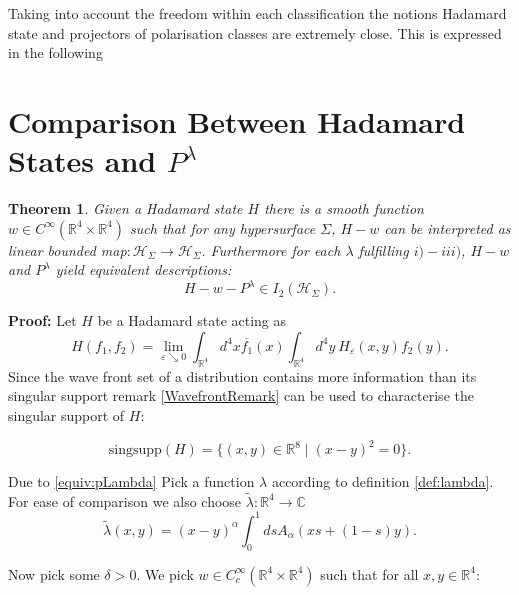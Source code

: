 \documentclass[a4paper,11pt]{article}
\newtheorem{thm}{Theorem}
\begin{document}
Taking into account the freedom within each classification the notions Hadamard state and  projectors of polarisation classes are extremely close. This is expressed in the following

\section{Comparison Between Hadamard States and \(P^\lambda\)}

\begin{thm}
Given a Hadamard state \(H\) there is a smooth function  \(w\in C^\infty(\mathbb{R}^4\times \mathbb{R}^4)\) such that
for any hypersurface \(\Sigma\), \(H-w\) can be interpreted as linear bounded map\(:\mathcal{H}_\Sigma\rightarrow \mathcal{H}_\Sigma\).
Furthermore for each \(\lambda\) fulfilling \(i)-iii)\), \(H-w\) and \(P^\lambda\) yield equivalent descriptions:
\begin{equation}
H-w-P^\lambda \in I_2(\mathcal{H}_\Sigma).
\end{equation}


\end{thm}

{\bf Proof:} Let \(H\) be a Hadamard state acting as 
\begin{equation}
H(f_1,f_2)=\lim_{\varepsilon\searrow 0} \int_{\mathbb{R}^4}d^4 x \overline{f_1}(x) \int_{\mathbb{R}^4} d^4y ~H_\varepsilon(x,y) f_2(y).
\end{equation}
 Since the 
wave front set of a distribution contains more information than its singular support
remark \ref{WavefrontRemark} can be used
 to characterise the singular support of \(H\):

\begin{equation}
\text{singsupp}(H)=\{(x,y)\in\mathbb{R}^8\mid (x-y)^2=0\}.
\end{equation}

Due to \eqref{equiv:pLambda}
Pick a function \(\lambda\)  according to definition \ref{def:lambda}. For ease of comparison we also choose
\(\tilde{\lambda}:\mathbb{R}^4\rightarrow \mathbb{C}\)
\begin{equation}
\tilde{\lambda}(x,y)= (x-y)^\alpha\int_0^1 ds A_\alpha (x s + (1-s)y).
\end{equation}


Now pick some \(\delta>0\). We pick \(w\in C_c^\infty(\mathbb{R}^4\times\mathbb{R}^4)\)
such that for all \(x,y\in\mathbb{R}^4\):
\end{document}
